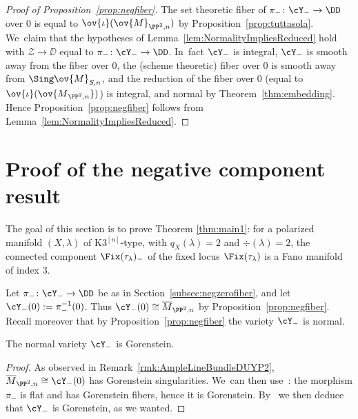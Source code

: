\begin{proof}[Proof of Proposition~\ref{prop:negfiber}]
The set theoretic fiber of $\pi_{-}\colon\cY_{-}\to\DD$ over $0$ is equal to $\ov{\iota}(\ov{M}_{\PP^2,n})$ by Proposition~\ref{prop:tuttasola}. We~claim that the hypotheses of Lemma~\ref{lem:NormalityImpliesReduced} hold with $\mathcal{Z}\to\DD$ equal to $\pi_{-}\colon\cY_{-}\to\DD$. In~fact $\cY_{-}$ is integral, $\cY_{-}$ is smooth away from the fiber over $0$, the (scheme theoretic) fiber over $0$ is smooth away from $\Sing \ov{M}_{S,n}$, and the reduction of the fiber over $0$ (equal to $\ov{\iota}(\ov{M{_{\PP^2,n}}})$) is integral, and normal by Theorem~\ref{thm:embedding}. Hence Proposition~\ref{prop:negfiber} follows from Lemma~\ref{lem:NormalityImpliesReduced}.
\end{proof}

\section{Proof of the negative component result}\label{sec:MainResult}

The goal of this section is to prove Theorem \ref{thm:main1}: for a polarized \HK manifold $(X,\lambda)$ of K3$^{[n]}$-type, with $q_X(\lambda)=2$ and $\div(\lambda)=2$, the connected component $\Fix(\tau_{\lambda})_-$ of the fixed locus $\Fix(\tau_\lambda)$ is a Fano manifold of index $3$.

Let $\pi_{-}\colon\cY_{-}\to \DD$ be as in Section~\ref{subsec:negzerofiber}, and let $\cY_{-}(0):=\pi_{-}^{-1}(0)$.
Thus $\cY_{-}(0)\cong\overline{M}_{\PP^2,n}$ by Proposition~\ref{prop:negfiber}.
Recall moreover that by Proposition~\ref{prop:negfiber} the variety $\cY_{-}$ is normal.

\begin{prop}\label{prop:KM}
The normal variety $\cY_-$ is Gorenstein.
\end{prop}

\begin{proof}
As observed in Remark~\ref{rmk:AmpleLineBundleDUYP2}, $\overline{M}_{\PP^2,n}\cong\cY_{-}(0)$ has Gorenstein singularities. We~can then use~: the morphism $\pi_-$ is flat and has Gorenstein fibers, hence it is Gorenstein.
By~ we then deduce that $\cY_-$ is Gorenstein, as we wanted.
\end{proof}

